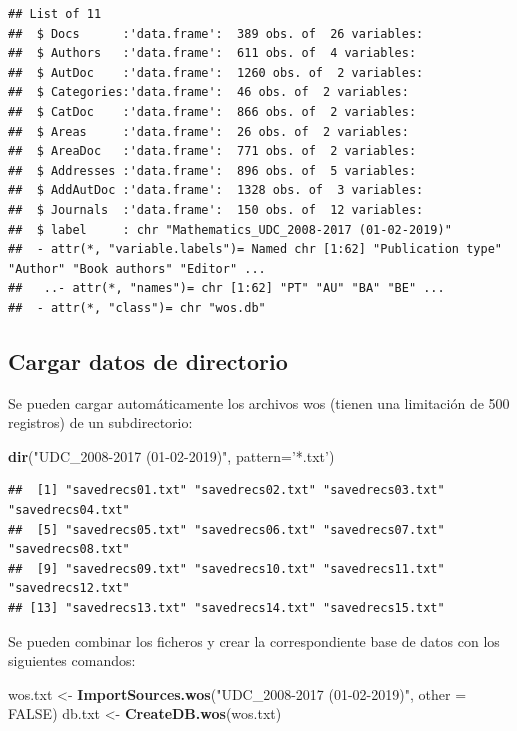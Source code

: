 \documentclass[
]{book}
\newenvironment{Shaded}{\begin{snugshade}}{\end{snugshade}}
\newcommand{\DataTypeTok}[1]{\textcolor[rgb]{0.13,0.29,0.53}{#1}}
\newcommand{\KeywordTok}[1]{\textcolor[rgb]{0.13,0.29,0.53}{\textbf{#1}}}
\newcommand{\NormalTok}[1]{#1}
\newcommand{\OtherTok}[1]{\textcolor[rgb]{0.56,0.35,0.01}{#1}}
\newcommand{\StringTok}[1]{\textcolor[rgb]{0.31,0.60,0.02}{#1}}
\begin{document}
\begin{verbatim}
## List of 11
##  $ Docs      :'data.frame':  389 obs. of  26 variables:
##  $ Authors   :'data.frame':  611 obs. of  4 variables:
##  $ AutDoc    :'data.frame':  1260 obs. of  2 variables:
##  $ Categories:'data.frame':  46 obs. of  2 variables:
##  $ CatDoc    :'data.frame':  866 obs. of  2 variables:
##  $ Areas     :'data.frame':  26 obs. of  2 variables:
##  $ AreaDoc   :'data.frame':  771 obs. of  2 variables:
##  $ Addresses :'data.frame':  896 obs. of  5 variables:
##  $ AddAutDoc :'data.frame':  1328 obs. of  3 variables:
##  $ Journals  :'data.frame':  150 obs. of  12 variables:
##  $ label     : chr "Mathematics_UDC_2008-2017 (01-02-2019)"
##  - attr(*, "variable.labels")= Named chr [1:62] "Publication type" "Author" "Book authors" "Editor" ...
##   ..- attr(*, "names")= chr [1:62] "PT" "AU" "BA" "BE" ...
##  - attr(*, "class")= chr "wos.db"
\end{verbatim}

\hypertarget{cargar-datos-de-directorio}{%
\subsection{Cargar datos de directorio}\label{cargar-datos-de-directorio}}

Se pueden cargar automáticamente los archivos wos
(tienen una limitación de 500 registros) de un subdirectorio:

\begin{Shaded}
\begin{Highlighting}[]
\KeywordTok{dir}\NormalTok{(}\StringTok{"UDC_2008-2017 (01-02-2019)"}\NormalTok{, }\DataTypeTok{pattern=}\StringTok{'*.txt'}\NormalTok{)}
\end{Highlighting}
\end{Shaded}

\begin{verbatim}
##  [1] "savedrecs01.txt" "savedrecs02.txt" "savedrecs03.txt" "savedrecs04.txt"
##  [5] "savedrecs05.txt" "savedrecs06.txt" "savedrecs07.txt" "savedrecs08.txt"
##  [9] "savedrecs09.txt" "savedrecs10.txt" "savedrecs11.txt" "savedrecs12.txt"
## [13] "savedrecs13.txt" "savedrecs14.txt" "savedrecs15.txt"
\end{verbatim}

Se pueden combinar los ficheros y crear la correspondiente base de datos con los siguientes comandos:

\begin{Shaded}
\begin{Highlighting}[]
\NormalTok{wos.txt <-}\StringTok{ }\KeywordTok{ImportSources.wos}\NormalTok{(}\StringTok{"UDC_2008-2017 (01-02-2019)"}\NormalTok{, }\DataTypeTok{other =} \OtherTok{FALSE}\NormalTok{)}
\NormalTok{db.txt <-}\StringTok{ }\KeywordTok{CreateDB.wos}\NormalTok{(wos.txt)}
\end{Highlighting}
\end{Shaded}
\end{document}
